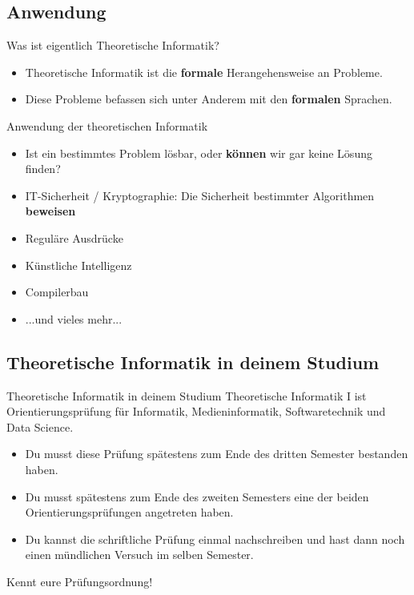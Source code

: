 \subsection{Anwendung}
\begin{frame}[fragile]{Was ist eigentlich Theoretische Informatik?}
    \begin{itemize} 
    \item Theoretische Informatik ist die \textbf{formale} Herangehensweise an Probleme.\\
    \item Diese Probleme befassen sich unter Anderem mit den \textbf{formalen} Sprachen.
    \end{itemize}
\end{frame}

\begin{frame}{Anwendung der theoretischen Informatik}
    \begin{itemize}
        \item Ist ein bestimmtes Problem lösbar, oder \textbf{können} wir gar keine Lösung finden?
        \item IT-Sicherheit / Kryptographie: Die Sicherheit bestimmter Algorithmen \textbf{beweisen}
        \item Reguläre Ausdrücke
        \item Künstliche Intelligenz
        \item Compilerbau
        \item ...und vieles mehr...
    \end{itemize}
\end{frame}

\subsection{Theoretische Informatik in deinem Studium}
\begin{frame}[fragile]{Theoretische Informatik in deinem Studium}
Theoretische Informatik I ist Orientierungsprüfung für Informatik, Medieninformatik, Softwaretechnik und Data Science.
    \begin{itemize} 
    \item Du musst diese Prüfung spätestens zum Ende des dritten Semester bestanden haben.
    \item Du musst spätestens zum Ende des zweiten Semesters eine der beiden Orientierungsprüfungen angetreten haben.
    \item Du kannst die schriftliche Prüfung einmal nachschreiben und hast dann noch einen mündlichen Versuch im selben Semester.
    \end{itemize}
    \alert{Kennt eure Prüfungsordnung!}
\end{frame}

